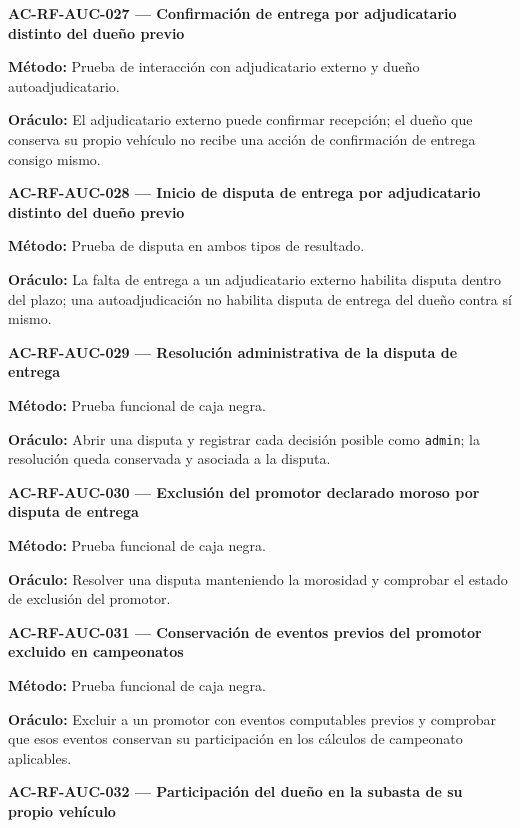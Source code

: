 \documentclass[10pt,letterpaper]{article}
\begin{document}
\noindent\textbf{AC-RF-AUC-027 --- Confirmación de entrega por adjudicatario distinto del dueño previo}\par
\textbf{Método:} Prueba de interacción con adjudicatario externo y dueño autoadjudicatario.\par
\textbf{Oráculo:} El adjudicatario externo puede confirmar recepción; el dueño que conserva su propio vehículo no recibe una acción de confirmación de entrega consigo mismo.\par\vspace{0.45em}
\noindent\textbf{AC-RF-AUC-028 --- Inicio de disputa de entrega por adjudicatario distinto del dueño previo}\par
\textbf{Método:} Prueba de disputa en ambos tipos de resultado.\par
\textbf{Oráculo:} La falta de entrega a un adjudicatario externo habilita disputa dentro del plazo; una autoadjudicación no habilita disputa de entrega del dueño contra sí mismo.\par\vspace{0.45em}
\noindent\textbf{AC-RF-AUC-029 --- Resolución administrativa de la disputa de entrega}\par
\textbf{Método:} Prueba funcional de caja negra.\par
\textbf{Oráculo:} Abrir una disputa y registrar cada decisión posible como \texttt{admin}; la resolución queda conservada y asociada a la disputa.\par\vspace{0.45em}
\noindent\textbf{AC-RF-AUC-030 --- Exclusión del promotor declarado moroso por disputa de entrega}\par
\textbf{Método:} Prueba funcional de caja negra.\par
\textbf{Oráculo:} Resolver una disputa manteniendo la morosidad y comprobar el estado de exclusión del promotor.\par\vspace{0.45em}
\noindent\textbf{AC-RF-AUC-031 --- Conservación de eventos previos del promotor excluido en campeonatos}\par
\textbf{Método:} Prueba funcional de caja negra.\par
\textbf{Oráculo:} Excluir a un promotor con eventos computables previos y comprobar que esos eventos conservan su participación en los cálculos de campeonato aplicables.\par\vspace{0.45em}
\noindent\textbf{AC-RF-AUC-032 --- Participación del dueño en la subasta de su propio vehículo}\par
\end{document}
